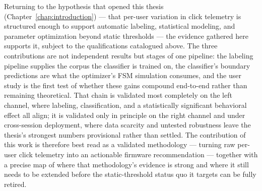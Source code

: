 Returning to the hypothesis that opened this thesis (Chapter~\ref{chap:introduction}) ---
that per-user variation in click telemetry is structured enough to support
automatic labeling, statistical modeling, and parameter optimization beyond
static thresholds --- the evidence gathered here supports it, subject to the
qualifications catalogued above. The three contributions are not independent
results but stages of one pipeline: the labeling pipeline supplies the corpus
the classifier is trained on, the classifier's boundary predictions are what
the optimizer's FSM simulation consumes, and the user study is the first test
of whether these gains compound end-to-end rather than remaining theoretical.
That chain is validated most completely on the left channel, where labeling,
classification, and a statistically significant behavioral effect all align;
it is validated only in principle on the right channel and under cross-session
deployment, where data scarcity and untested robustness leave the thesis's
strongest numbers provisional rather than settled. The contribution of this
work is therefore best read as a validated methodology --- turning raw
per-user click telemetry into an actionable firmware recommendation --- together
with a precise map of where that methodology's evidence is strong and where it
still needs to be extended before the static-threshold status quo it targets
can be fully retired.
